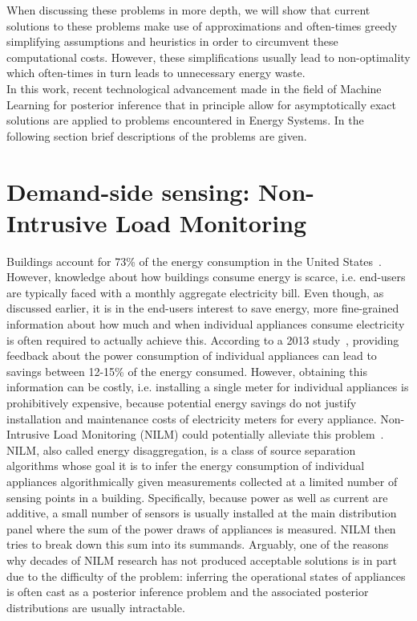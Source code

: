 \documentclass[11pt]{cmuthesis} %
\begin{document}
 When discussing these problems in more depth, we will show that current solutions to these problems make use of approximations and often-times greedy simplifying assumptions and heuristics in order to circumvent these computational costs. However, these simplifications usually lead to non-optimality which often-times in turn leads to unnecessary energy waste.\\
 
In this work, recent technological advancement made in the field of Machine Learning for posterior inference that in principle allow for asymptotically exact solutions are applied to problems encountered in Energy Systems. 
In the following section brief descriptions of the problems are given. 

\section{Demand-side sensing: Non-Intrusive Load Monitoring} 
Buildings account for 73\% of the energy consumption in the United States~\cite{li2014review}. However, knowledge about how buildings consume energy is scarce, i.e. end-users are typically faced with a monthly aggregate electricity bill. Even though, as discussed earlier, it is in the end-users interest to save energy, more fine-grained information about how much and when individual appliances consume electricity is often required to actually achieve this. According to a 2013 study~\cite{armel2013disaggregation}, providing feedback about the power consumption of individual appliances can lead to savings between 12-15\% of the energy consumed. However, obtaining this information can be costly, i.e. installing a single meter for individual appliances is prohibitively expensive, because potential energy savings do not justify installation and maintenance costs of electricity meters for every appliance. Non-Intrusive Load Monitoring (NILM) could potentially alleviate this problem~\cite{hart1992nonintrusive}. NILM, also called energy disaggregation, is a class of source separation algorithms whose goal it is to infer the energy consumption of individual appliances algorithmically given measurements collected at a limited number of sensing points in a building. Specifically, because power as well as current are additive, a small number of sensors is usually installed at the main distribution panel where the sum of the power draws of appliances is measured. NILM then tries to break down this sum into its summands. Arguably, one of the reasons why decades of NILM research has not produced acceptable solutions is in part due to the difficulty of the problem: inferring the operational states of appliances is often cast as a posterior inference problem and the associated posterior distributions are usually intractable.
\end{document}
